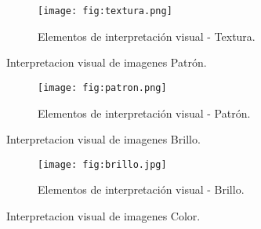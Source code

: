 
\begin{frame}{}
  \begin{figure}
    \centering
    \texttt{[image: fig:textura.png]}
    \caption{Elementos de interpretación visual - Textura.}
    \label{}
  \end{figure}
\end{frame}


\begin{frame}{}
    \begin{block}{Interpretacion visual de imagenes}
      Patrón.

    \end{block}
\end{frame}


\begin{frame}{}
  \begin{figure}
    \centering
    \texttt{[image: fig:patron.png]}
    \caption{Elementos de interpretación visual - Patrón.}
    \label{}
  \end{figure}
\end{frame}

\begin{frame}{}
    \begin{block}{Interpretacion visual de imagenes}
      Brillo.

    \end{block}
\end{frame}




\begin{frame}{}
  \begin{figure}
    \centering
    \texttt{[image: fig:brillo.jpg]}
    \caption{Elementos de interpretación visual - Brillo.}
    \label{}
  \end{figure}
\end{frame}


\begin{frame}{}
    \begin{block}{Interpretacion visual de imagenes}
     Color.

    \end{block}
\end{frame}


